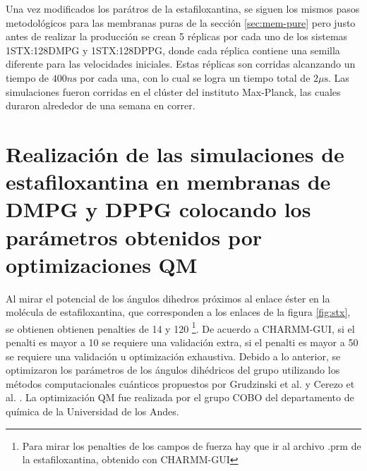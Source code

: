 Una vez modificados los par\'{a}tros de la estafiloxantina, se siguen los mismos pasos metodol\'{o}gicos para las membranas puras de la secci\'{o}n \ref{sec:mem-pure} pero justo antes de realizar la producci\'{o}n se crean 5 r\'{e}plicas por cada uno de los sistemas 1STX:128DMPG y 1STX:128DPPG, donde cada r\'{e}plica contiene una semilla diferente para las velocidades iniciales. Estas r\'{e}plicas son corridas alcanzando un tiempo de $400n\mathrm{s}$ por cada una, con lo cual se logra un tiempo total de $2\mu\mathrm{s}$. Las simulaciones fueron corridas en el cl\'{u}ster del instituto Max-Planck, las cuales duraron alrededor de una semana en correr.



\section{Realizaci\'{o}n de las simulaciones de estafiloxantina en membranas de DMPG y DPPG colocando los par\'{a}metros obtenidos por optimizaciones QM}\label{sec:qm}



Al mirar el potencial de los \'{a}ngulos dihedros pr\'{o}ximos al enlace \'{e}ster en la mol\'{e}cula de estafiloxantina, que corresponden a los enlaces  de la figura \ref{fig:stx}, se obtienen obtienen penalties de 14 y 120 \footnote{Para mirar los penalties de los campos de fuerza hay que ir al archivo .prm de la estafiloxantina, obtenido con CHARMM-GUI}. De acuerdo a CHARMM-GUI, si el penalti es mayor a 10 se requiere una validaci\'{o}n extra, si el penalti es mayor a 50 se requiere una validaci\'{o}n u optimizaci\'{o}n exhaustiva. Debido a lo anterior, se optimizaron los par\'{a}metros de los \'{a}ngulos dih\'{e}dricos del grupo  utilizando los m\'{e}todos computacionales cu\'{a}nticos propuestos por Grudzinski et al. \cite{Grudzinski2017LocalizationBilayer} y Cerezo et al. \cite{Cerezo2012AntioxidantSimulations}. La optimizaci\'{o}n QM fue realizada  por el grupo COBO del departamento de qu\'{i}mica de la Universidad de los Andes.\\

